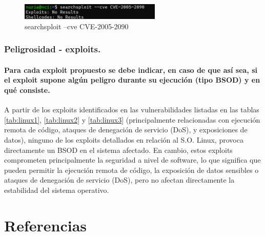 \documentclass[a4paper,12pt]{article} %
\begin{document}
            \begin{figure} [hp!]
             \centering
             \includegraphics[width=0.6\textwidth]{imagenes/cvelinux32.png}
             \caption{ searchsploit --cve CVE-2005-2090}
             \label{fig:linux32}
            \end{figure}

\subsubsection{Peligrosidad - exploits.}

\paragraph{Para cada exploit propuesto se debe indicar, en caso de que así sea, si el exploit supone algún peligro durante su ejecución (tipo BSOD) y en qué consiste.}


A partir de los exploits identificados en las vulnerabilidades listadas en las tablas \ref{tab:linux1}, \ref{tab:linux2} y \ref{tab:linux3} (principalmente relacionadas con ejecución remota de código, ataques de denegación de servicio (DoS), y exposiciones de datos), ninguno de los exploits detallados en relación al S.O. Linux, provoca directamente un BSOD en el sistema afectado. En cambio, estos exploits comprometen principalmente la seguridad a nivel de software, lo que significa que pueden permitir la ejecución remota de código, la exposición de datos sensibles o ataques de denegación de servicio (DoS), pero no afectan directamente la estabilidad del sistema operativo.








\newpage
\section{Referencias}
\printbibliography[heading=none]
\end{document}

